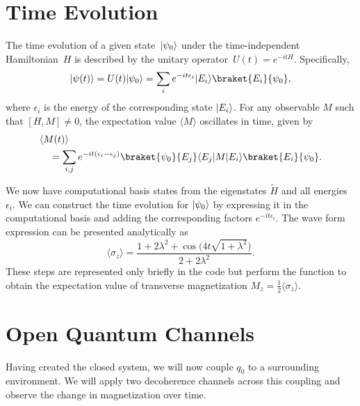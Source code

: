 \documentclass[12pt, twocolumn]{article}
\newcommand*{\eu}{e}
\newcommand*{\iu}{i}
\DeclarePairedDelimiter{\bra}{\langle}{\rvert}
\DeclarePairedDelimiter{\ket}{\lvert}{\rangle}
\begin{document}
  \section{Time Evolution}
  The time evolution of a given state~\( \ket{\psi_{0}} \) under the time-independent Hamiltonian~\( H \) is described by the unitary operator~\( U(t) = \eu^{-\iu t H} \). Specifically,
  \begin{equation}
    \ket{\psi(t)}
      = U(t) \ket{\psi_{0}}
      = \sum_{i} \eu^{-\iu t \epsilon_{i}} \ket{E_{i}} \braket{E_{i}}{\psi_{0}},
  \end{equation}
  where \( \epsilon_{i} \) is the energy of the corresponding state \( \ket{E_{i}} \). For any observable \( M \) such that \( [H, M] \neq 0 \), the expectation value \( \langle M \rangle \) oscillates in time, given by
  \begin{align}
    \MoveEqLeft[1] \langle M(t) \rangle \notag \\
      &= \sum_{i, j} \eu^{-\iu t (\epsilon_{i} - \epsilon_{j})}
         \braket{\psi_{0}}{E_{j}} \bra{E_{j}} M \ket{E_{i}}
         \braket{E_{i}}{\psi_{0}}.
  \end{align}

  We now have computational basis states from the eigenstates \( \tilde{H} \) and all energies \( \epsilon_{i} \). We can construct the time evolution for \( \ket{\psi_{0}} \) by expressing it in the computational basis and adding the corresponding factors \( \eu^{-\iu t \epsilon_{i}} \). The wave form expression can be presented analytically as
  \begin{equation}
    \langle \sigma_{z} \rangle
      = \frac{1 + 2 \lambda^{2} + \cos \bigl( 4 t \sqrt{1 + \lambda^{2}} \bigr)}
             {2 + 2 \lambda^{2}}.
  \end{equation}
  These steps are represented only briefly in the code but perform the function to obtain the expectation value of transverse magnetization \( M_{z} = \frac{1}{2} \langle \sigma_{z} \rangle \).

  \section{Open Quantum Channels}
  Having created the closed system, we will now couple \( q_{0} \) to a surrounding environment. We will apply two decoherence channels across this coupling and observe the change in magnetization over time.
\end{document}
